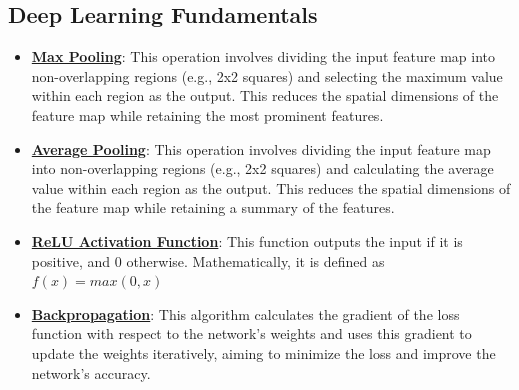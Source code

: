 \documentclass{article}%
\begin{document}
%
\subsection{Deep Learning Fundamentals}%
\label{subsec:DeepLearningFundamentals}%
\begin{itemize}[leftmargin=*]%
\item \href{https://purdue.brightspace.com/d2l/common/assets/pdfjs-d2l-dist/1.0.14-legacy/web/viewer.html?file=%2Fcontent%2Fenforced%2F1095467-wl.202510.CS.24300.001%2F09L1-cnn.pdf%3Fou%3D1095467&lang=en-us&container=d2l-fileviewer-rendered-pdf&fullscreen=d2l-fileviewer-rendered-pdf-dialog&height=667#page=14}{\textbf{Max Pooling}}: This operation involves dividing the input feature map into non-overlapping regions (e.g., 2x2 squares) and selecting the maximum value within each region as the output. This reduces the spatial dimensions of the feature map while retaining the most prominent features.%
\item \href{https://purdue.brightspace.com/d2l/common/assets/pdfjs-d2l-dist/1.0.14-legacy/web/viewer.html?file=%2Fcontent%2Fenforced%2F1095467-wl.202510.CS.24300.001%2F09L1-cnn.pdf%3Fou%3D1095467&lang=en-us&container=d2l-fileviewer-rendered-pdf&fullscreen=d2l-fileviewer-rendered-pdf-dialog&height=667#page=15}{\textbf{Average Pooling}}: This operation involves dividing the input feature map into non-overlapping regions (e.g., 2x2 squares) and calculating the average value within each region as the output. This reduces the spatial dimensions of the feature map while retaining a summary of the features.%
\item \href{https://purdue.brightspace.com/d2l/common/assets/pdfjs-d2l-dist/1.0.14-legacy/web/viewer.html?file=%2Fcontent%2Fenforced%2F1095467-wl.202510.CS.24300.001%2F09L1-cnn.pdf%3Fou%3D1095467&lang=en-us&container=d2l-fileviewer-rendered-pdf&fullscreen=d2l-fileviewer-rendered-pdf-dialog&height=667#page=13}{\textbf{ReLU Activation Function}}: This function outputs the input if it is positive, and 0 otherwise. Mathematically, it is defined as $f(x) = max(0, x)$%
\item \href{https://purdue.brightspace.com/d2l/common/assets/pdfjs-d2l-dist/1.0.14-legacy/web/viewer.html?file=%2Fcontent%2Fenforced%2F1095467-wl.202510.CS.24300.001%2F09L1-cnn.pdf%3Fou%3D1095467&lang=en-us&container=d2l-fileviewer-rendered-pdf&fullscreen=d2l-fileviewer-rendered-pdf-dialog&height=667#page=16}{\textbf{Backpropagation}}: This algorithm calculates the gradient of the loss function with respect to the network's weights and uses this gradient to update the weights iteratively, aiming to minimize the loss and improve the network's accuracy.%
\end{itemize}
\end{document}
